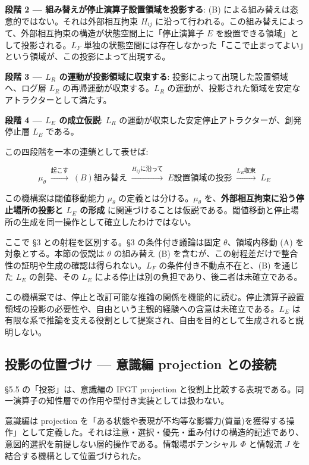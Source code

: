 \textbf{段階 2 — 組み替えが停止演算子設置領域を投影する}:
(B) による組み替えは恣意的ではない。それは外部相互拘束 $H_{ij}$ に沿って行われる。この組み替えによって、外部相互拘束の構造が状態空間上に「停止演算子 $E$ を設置できる領域」として投影される。$L_F$ 単独の状態空間には存在しなかった「ここで止まってよい」という領域が、この投影によって出現する。

\textbf{段階 3 — $L_R$ の運動が投影領域に収束する}:
投影によって出現した設置領域へ、ログ層 $L_R$ の再帰運動が収束する。$L_R$ の運動が、投影された領域を安定なアトラクターとして満たす。

\textbf{段階 4 — $L_E$ の成立仮説}:
$L_R$ の運動が収束した安定停止アトラクターが、創発停止層 $L_E$ である。

この四段階を一本の連鎖として表せば:

\[
\mu_\theta \;\xrightarrow{\text{起こす}}\; (B)\text{組み替え} \;\xrightarrow{H_{ij}\text{に沿って}}\; E\text{設置領域の投影} \;\xrightarrow{L_R\text{収束}}\; L_E
\]

この機構案は閾値移動能力 $\mu_\theta$ の定義とは分ける。$\mu_\theta$ を、\textbf{外部相互拘束に沿う停止場所の投影と $L_E$ の形成} に関連づけることは仮説である。閾値移動と停止場所の生成を同一操作として確立したわけではない。

ここで \S{}3 との射程を区別する。\S{}3 の条件付き議論は固定 $\theta$、領域内移動 (A) を対象とする。本節の仮説は $\theta$ の組み替え (B) を含むが、この射程差だけで整合性の証明や生成の確認は得られない。$L_F$ の条件付き不動点不在と、(B) を通じた $L_E$ の創発、その $L_E$ による停止は別の負担であり、後二者は未確立である。

この機構案では、停止と改訂可能な推論の関係を機能的に読む。停止演算子設置領域の投影の必要性や、自由という主観的経験への含意は未確立である。$L_E$ は有限な系で推論を支える役割として提案され、自由を目的として生成されると説明しない。

\bigskip


\subsection{投影の位置づけ — 意識編 projection との接続}


\S{}5.5 の「投影」は、意識編の IFGT projection と役割上比較する表現である。同一演算子の知性層での作用や型付き実装としては扱わない。

意識編は projection を「ある状態や表現が不均等な影響力(質量)を獲得する操作」として定義した。それは注意・選択・優先・重み付けの構造的記述であり、意図的選択を前提しない層的操作である。情報場ポテンシャル $\Phi$ と情報流 $J$ を結合する機構として位置づけられた。

